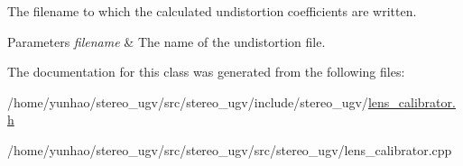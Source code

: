 The filename to which the calculated undistortion coefficients are written. 


\begin{DoxyParams}{Parameters}
{\em filename} & The name of the undistortion file. \\
\hline
\end{DoxyParams}


The documentation for this class was generated from the following files\+:\begin{DoxyCompactItemize}
\item 
/home/yunhao/stereo\+\_\+ugv/src/stereo\+\_\+ugv/include/stereo\+\_\+ugv/\hyperlink{lens__calibrator_8h}{lens\+\_\+calibrator.\+h}\item 
/home/yunhao/stereo\+\_\+ugv/src/stereo\+\_\+ugv/src/stereo\+\_\+ugv/lens\+\_\+calibrator.\+cpp\end{DoxyCompactItemize}
